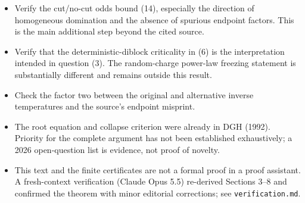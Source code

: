 \documentclass[11pt,a4paper]{report}
\begin{document}
\begin{itemize}
\tightlist
\item
  Verify the cut/no-cut odds bound (14), especially the direction of homogeneous domination and the absence of spurious endpoint factors. This is the main additional step beyond the cited source.
\item
  Verify that the deterministic-diblock criticality in (6) is the interpretation intended in question (3). The random-charge power-law freezing statement is substantially different and remains outside this result.
\item
  Check the factor two between the original and alternative inverse temperatures and the source's endpoint misprint.
\item
  The root equation and collapse criterion were already in DGH (1992). Priority for the complete argument has not been established exhaustively; a 2026 open-question list is evidence, not proof of novelty.
\item
  This text and the finite certificates are not a formal proof in a proof assistant. A fresh-context verification (Claude Opus 5.5) re-derived Sections 3--8 and confirmed the theorem with minor editorial corrections; see \texttt{verification.md}.
\end{itemize}
\end{document}

